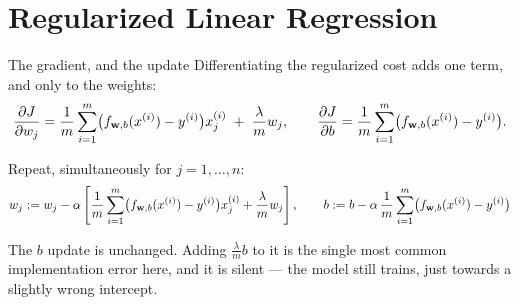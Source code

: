\documentclass[aspectratio=169,10pt]{beamer}
\begin{document}
\section{Regularized Linear Regression}

\begin{frame}{The gradient, and the update}
  \footnotesize
  Differentiating the regularized cost adds one term, and only to the weights:
  \[
    \frac{\partial J}{\partial w_j}
      = \frac{1}{m}\sum_{i=1}^{m}\bigl(f_{\mathbf{w},b}(x^{(i)})-y^{(i)}\bigr)x^{(i)}_{j}
        \;+\; \frac{\lambda}{m}w_j ,
    \qquad
    \frac{\partial J}{\partial b}
      = \frac{1}{m}\sum_{i=1}^{m}\bigl(f_{\mathbf{w},b}(x^{(i)})-y^{(i)}\bigr) .
  \]
  \begin{defnbox}
    Repeat, simultaneously for $j=1,\dots,n$:
    \[
      w_j := w_j - \alpha\left[\frac{1}{m}\sum_{i=1}^{m}
        \bigl(f_{\mathbf{w},b}(x^{(i)})-y^{(i)}\bigr)x^{(i)}_{j} + \frac{\lambda}{m}w_j\right],
      \qquad
      b := b - \alpha\,\frac{1}{m}\sum_{i=1}^{m}\bigl(f_{\mathbf{w},b}(x^{(i)})-y^{(i)}\bigr)
    \]
  \end{defnbox}
  \begin{pitfall}
    The $b$ update is unchanged. Adding $\tfrac{\lambda}{m}b$ to it is the single most common
    implementation error here, and it is silent --- the model still trains, just towards a
    slightly wrong intercept.
  \end{pitfall}
\end{frame}
\end{document}
